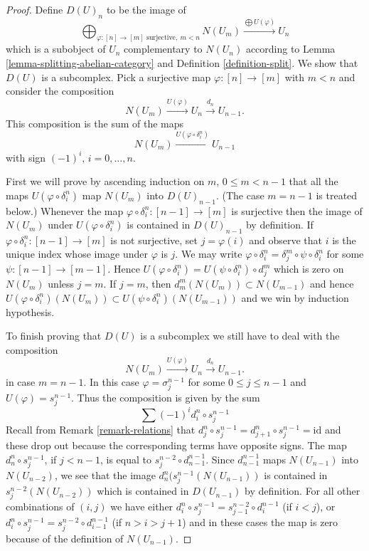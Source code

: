 \begin{proof}
Define $D(U)_n$ to be the image of
$$
\bigoplus\nolimits_{\varphi : [n] \to [m]\text{ surjective}, \ m < n} N(U_m)
\xrightarrow{\bigoplus U(\varphi)}
U_n
$$
which is a subobject of $U_n$ complementary to
$N(U_n)$ according to Lemma \ref{lemma-splitting-abelian-category} and
Definition \ref{definition-split}. We show that
$D(U)$ is a subcomplex. Pick a surjective
map $\varphi : [n] \to [m]$ with $m < n$ and consider
the composition
$$
N(U_m) \xrightarrow{U(\varphi)} U_n \xrightarrow{d_n} U_{n - 1}.
$$
This composition is the sum of the maps
$$
N(U_m) \xrightarrow{U(\varphi \circ \delta^n_i)} U_{n - 1}
$$
with sign $(-1)^i$, $i = 0, \ldots, n$.

\medskip\noindent
First we will prove by ascending induction on $m$,
$0 \leq m < n - 1$ that all the maps $U(\varphi \circ \delta^n_i)$
map $N(U_m)$ into $D(U)_{n - 1}$. (The case $m = n - 1$ is treated below.)
Whenever the map $\varphi \circ \delta^n_i : [n - 1] \to [m]$
is surjective then the image of $N(U_m)$ under $U(\varphi \circ \delta^n_i)$
is contained in $D(U)_{n - 1}$ by definition.
If $\varphi \circ \delta^n_i : [n - 1] \to [m]$ is not surjective,
set $j = \varphi(i)$ and observe that $i$ is the unique
index whose image under $\varphi$ is $j$. We may write
$\varphi \circ \delta^n_i = \delta^m_j \circ \psi \circ \delta^n_i$
for some $\psi : [n - 1] \to [m - 1]$. Hence
$U(\varphi \circ \delta^n_i) = U(\psi \circ \delta^n_i) \circ d^m_j$ which
is zero on $N(U_m)$ unless $j = m$. If $j = m$, then
$d^m_m(N(U_m)) \subset N(U_{m - 1})$ and hence
$U(\varphi \circ \delta^n_i)(N(U_m)) \subset
U(\psi \circ \delta^n_i)(N(U_{m - 1}))$ and we win
by induction hypothesis.

\medskip\noindent
To finish proving that $D(U)$ is a subcomplex
we still have to deal with the composition
$$
N(U_m) \xrightarrow{U(\varphi)} U_n \xrightarrow{d_n} U_{n - 1}.
$$
in case $m =  n - 1$. In this case $\varphi = \sigma^{n - 1}_j$
for some $0 \leq j \leq n - 1$ and $U(\varphi) = s^{n - 1}_j$.
Thus the composition is given by the sum
$$
\sum (-1)^i d^n_i \circ s^{n - 1}_j
$$
Recall from Remark \ref{remark-relations} that
$d^n_j \circ s^{n - 1}_j = d^n_{j + 1} \circ s^{n - 1}_j = \text{id}$
and these drop out because the corresponding terms have opposite signs.
The map $d^n_n \circ s^{n - 1}_j$, if $j < n - 1$, is equal to
$s^{n - 2}_j \circ d^{n - 1}_{n - 1}$. Since
$d^{n - 1}_{n - 1}$ maps $N(U_{n - 1})$ into $N(U_{n - 2})$,
we see that the image $d^n_n ( s^{n - 1}_j (N(U_{n - 1}))$
is contained in $s^{n - 2}_j(N(U_{n - 2}))$ which
is contained in $D(U_{n - 1})$ by definition. For all
other combinations of $(i, j)$ we have
either $d^n_i \circ s^{n - 1}_j = s^{n - 2}_{j - 1} \circ d^{n - 1}_i$
(if $i < j$), or
$d^n_i \circ s^{n - 1}_j = s^{n - 2}_j \circ d^{n - 1}_{i - 1}$
(if $n > i > j + 1$) and in these cases the map is zero because
of the definition of $N(U_{n - 1})$.
\end{proof}

